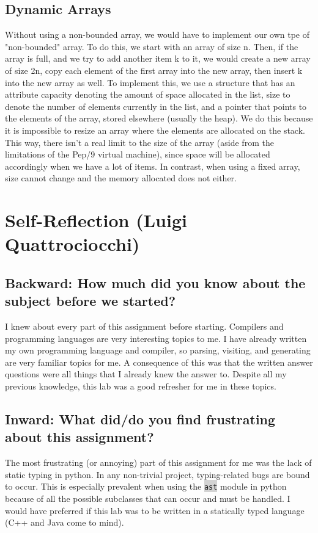 \documentclass[12pt]{article}
\newcommand{\code}[1]{\colorbox{LightGray}{\texttt{#1}}}
\begin{document}
\subsection*{Dynamic Arrays}
Without using a non-bounded array, we would have to implement our own tpe of "non-bounded" array. To do this, we start with an array of size n. Then, if the array is full, and we try to add another item k to it, we would create a new array of size 2n, copy each element of the first array into the new array, then insert k into the new array as well. To implement this, we use a structure that has an attribute capacity denoting the amount of space allocated in the list, size to denote the number of elements currently in the list, and a pointer that points to the elements of the array, stored elsewhere (usually the heap). We do this because it is impossible to resize an array where the elements are allocated on the stack. This way, there isn't a real limit to the size of the array (aside from the limitations of the Pep/9 virtual machine), since space will be allocated accordingly when we have a lot of items. In contrast, when using a fixed array, size cannot change and the memory allocated does not either.

\pagebreak

\section*{Self-Reflection (Luigi Quattrociocchi)}
\subsection*{Backward: How much did you know about the subject before we started?}
I knew about every part of this assignment before starting. Compilers and programming languages are very interesting topics to me. I have already written my own programming language and compiler, so parsing, visiting, and generating are very familiar topics for me. A consequence of this was that the written answer questions were all things that I already knew the answer to. Despite all my previous knowledge, this lab was a good refresher for me in these topics.

\subsection*{Inward: What did/do you find frustrating about this assignment?}
The most frustrating (or annoying) part of this assignment for me was the lack of static typing in python. In any non-trivial project, typing-related bugs are bound to occur. This is especially prevalent when using the \code{ast} module in python because of all the possible subclasses that can occur and must be handled. I would have preferred if this lab was to be written in a statically typed language (C++ and Java come to mind).
\end{document}
